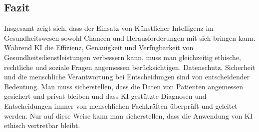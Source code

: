 \documentclass{report}
\begin{document}
\subsection {Fazit}

Insgesamt zeigt sich, dass der Einsatz von Künstlicher Intelligenz im Gesundheitswesen sowohl Chancen
und Herausforderungen mit sich bringen kann. Während KI die Effizienz, Genauigkeit und Verfügbarkeit
von Gesundheitsdienstleistungen verbessern kann, muss man gleichzeitig ethische, rechtliche und soziale Fragen angemessen berücksichtigen.
Datenschutz, Sicherheit und die menschliche Verantwortung bei Entscheidungen sind von entscheidender Bedeutung. Man muss sicherstellen,
dass die Daten von Patienten angemessen gesichert und privat bleiben und dass KI-gestützte
Diagnosen und Entscheidungen immer von menschlichen Fachkräften überprüft und geleitet werden. Nur auf diese Weise
kann man sicherstellen, dass die Anwendung von KI ethisch vertretbar bleibt.



\printbibliography
\listoffigures
\end{document}
